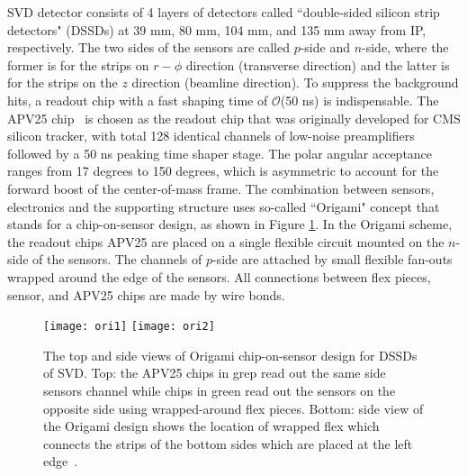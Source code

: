 SVD detector consists of 4 layers of detectors called  ``double-sided silicon strip detectors" (DSSDs) at 39 mm, 80 mm, 104 mm, and 135 mm away from IP, respectively. The two sides of the sensors are called $p$-side and $n$-side, where the former is for the strips on $r-\phi$ direction (transverse direction) and the latter is for the strips on the $z$ direction (beamline direction). To suppress the background hits, a readout chip with a fast shaping time of $\mathcal{O}$(50 ns) is indispensable. The APV25 chip~\cite{french2001design} is chosen as the readout chip that was originally developed for CMS silicon tracker, with total 128 identical channels of low-noise preamplifiers followed by a 50 ns peaking time shaper stage. The polar angular acceptance ranges from 17 degrees to 150 degrees, which is asymmetric to account for the
forward boost of the center-of-mass frame. The combination between sensors, electronics and the supporting structure uses so-called ``Origami" concept that stands for a chip-on-sensor design, as shown in Figure \ref{fig:origami}. In the Origami scheme, the readout chips APV25 are placed on a single flexible circuit mounted on the $n$-side of the sensors. The channels of $p$-side are attached by small flexible fan-outs wrapped around the edge of the sensors. All connections between flex pieces, sensor, and APV25 chips are made by wire bonds.
\begin{figure}[htpb]
	\centering
	\texttt{[image: ori1]}
	\texttt{[image: ori2]}
	\caption{The top and side views of Origami chip-on-sensor design for DSSDs of SVD. Top: the APV25 chips in grep read out the same side sensors channel while chips in green read out the sensors on the opposite side using wrapped-around flex pieces. Bottom: side view of the Origami design shows the location of wrapped flex which connects the strips of the bottom sides which are placed at the left edge~\cite{Abe:2010gxa}.}
	\label{fig:origami}
\end{figure}



